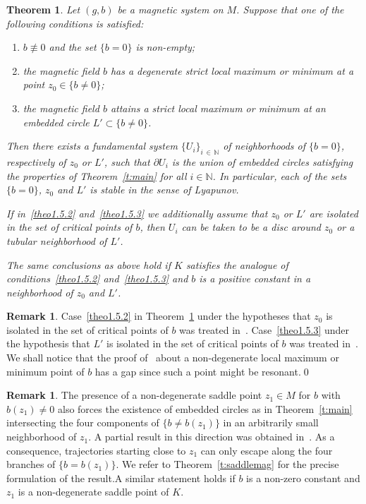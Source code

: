 \documentclass[10pt]{amsart}
\newtheorem{theo}[cdrthm]{Theorem}
\theoremstyle{definition}
\newtheorem{rema}[cdrthm]{Remark}
\newcommand{\N}{\mathbb{N}}
\newcommand{\p}{\partial}
\begin{document}
\begin{theo}\label{t:main2}
Let $(g,b)$ be a magnetic system on $M$. Suppose that one of the following conditions is satisfied:
\begin{enumerate}
\item\label{theo1.5.1} $b\not\equiv 0$ and the set $\{b=0\}$ is non-empty;
\item\label{theo1.5.2} the magnetic field $b$ has a degenerate strict local maximum or minimum at a point $z_0\in\{b\neq0\}$;
\item\label{theo1.5.3} the magnetic field $b$ attains a strict local maximum or minimum at an embedded circle $L'\subset\{b\neq0\}$.
\end{enumerate}
Then there exists a fundamental system $\{U_i\}_{i\,\in\,\N}$ of neighborhoods of $\{b=0\}$, respectively of $z_0$ or $L'$, such that $\p U_i$ is the union of embedded circles satisfying the properties of Theorem~\ref{t:main} for all $i\in\N$. In particular, each of the sets $\{b=0\}$, $z_0$ and $L'$ is stable in the sense of Lyapunov.

If in~\eqref{theo1.5.2} and~\eqref{theo1.5.3}  we additionally assume that $z_0$ or $L'$ are isolated in the set of critical points of $b$, then $U_i$ can be taken to be a disc around $z_0$ or a tubular neighborhood of $L'$.

The same conclusions as above hold if $K$ satisfies the analogue of conditions~\eqref{theo1.5.2} and~\eqref{theo1.5.3} and $b$ is a positive constant in a neighborhood of $z_0$ and $L'$.
\end{theo}


\begin{rema}
Case~\eqref{theo1.5.2} in Theorem~\ref{t:main2} under the hypotheses that $z_0$ is isolated in the set of critical points of $b$ was treated in~\cite[Corollary~1.5]{AB21}. Case~\eqref{theo1.5.3} under the hypothesis that $L'$ is isolated in the set of critical points of $b$ was treated in~\cite[Corollary~1.3]{Castilho:2001}. We shall notice that the proof of~\cite[Corollary~1.2]{Castilho:2001} about a non-degenerate local maximum or minimum point of $b$ has a gap since such a point might be resonant.\qed
\end{rema}

\begin{rema}\label{r:saddle}
The presence of a non-degenerate saddle point $z_1\in M$ for $b$ with $b(z_1)\neq0$ also forces the existence of embedded circles as in Theorem~\ref{t:main} intersecting the four components of $\{b\neq b(z_1)\}$ in an arbitrarily small neighborhood of $z_1$. A partial result in this direction was obtained in~\cite[Theorem~1.6]{AB21}. As a consequence, trajectories starting close to $z_1$ can only escape along the four branches of $\{b=b(z_1)\}$. We refer to Theorem~\ref{t:saddlemag} for the precise formulation of the result.\linebreak A similar statement holds if $b$ is a non-zero constant and $z_1$ is a non-degenerate saddle point of $K$.
\end{rema}
\end{document}
